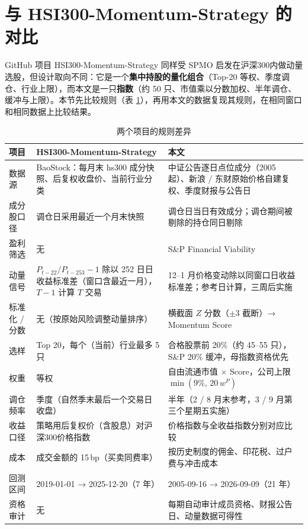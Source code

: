 \documentclass[11pt,a4paper]{article}
\begin{document}
\section{与 HSI300-Momentum-Strategy 的对比}\label{sec:hsmo}
GitHub 项目 HSI300-Momentum-Strategy \cite{hsmo} 同样受 SPMO 启发在沪深300内做动量选股，但设计取向不同：它是一个\textbf{集中持股的量化组合}（Top-20 等权、季度调仓、行业上限），而本文是一只\textbf{指数}（约 50 只、市值乘以分数加权、半年调仓、缓冲与上限）。本节先比较规则（表 \ref{tab:hsmo_rules}），再用本文的数据复现其规则，在相同窗口和相同数据上比较结果。
\begin{table}[!htbp]
\centering
\footnotesize
\caption{两个项目的规则差异}\label{tab:hsmo_rules}
\begin{tabular}{@{}p{1.9cm}p{6.2cm}p{6.6cm}@{}}
\toprule
项目 & HSI300-Momentum-Strategy & 本文 \\
\midrule
数据源 & BaoStock：每月末 hs300 成分快照、后复权收盘价、当前行业分类 & 中证公告逐日点位成分（2005 起）、新浪 / 东财原始价格自建复权、季度财报与公告日 \\
成分股口径 & 调仓日采用最近一个月末快照 & 调仓日当日有效成分；调仓期间被剔除的持仓同日剔除 \\
盈利筛选 & 无 & S\&P Financial Viability \\
动量信号 & $P_{t-22}/P_{t-253}-1$ 除以 252 日日收益标准差（窗口含最近一月），$T-1$ 计算 $T$ 交易 & 12--1 月价格变动除以同窗口日收益标准差；参考日计算，三周后实施 \\
标准化 / 分数 & 无（按原始风险调整动量排序） & 横截面 $Z$ 分数（$\pm 3$ 截断）→ Momentum Score \\
选样 & Top 20，每个（当前）行业最多 5 只 & 合格股票前 20\%（约 45--55 只），S\&P 20\% 缓冲，母指数资格优先 \\
权重 & 等权 & 自由流通市值 $\times$ Score，公司上限 $\min(9\%,\,20\,w^P)$ \\
调仓频率 & 季度（自然季末最后一个交易日收盘） & 半年（2 / 8 月末参考，3 / 9 月第三个星期五实施） \\
收益口径 & 策略用后复权价（含股息）对沪深300价格指数 & 价格指数与全收益指数分别对应比较 \\
成本 & 成交金额的 15\,bp（买卖同费率） & 按历史制度的佣金、印花税、过户费与冲击成本 \\
回测区间 & 2019-01-01 → 2025-12-20（7 年） & 2005-09-16 → 2026-09-09（21 年） \\
资格审计 & 无 & 每期自动审计成员资格、财报公告日、动量数据可得性 \\
\bottomrule
\end{tabular}
\end{table}
\end{document}
